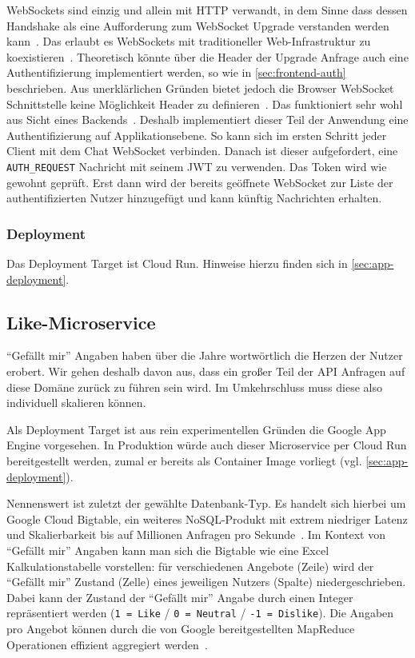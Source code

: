 \documentclass{article}
\begin{document}
WebSockets sind einzig und allein mit HTTP verwandt, in dem Sinne dass dessen Handshake als eine Aufforderung zum WebSocket Upgrade verstanden werden kann~\cite[p.~57]{fielding2014rfc}. Das erlaubt es WebSockets mit traditioneller Web-Infrastruktur zu koexistieren~\cite[pp.~10--11]{fette2011websocket}. Theoretisch könnte über die Header der Upgrade Anfrage auch eine Authentifizierung implementiert werden, so wie in \autoref{sec:frontend-auth} beschrieben. Aus unerklärlichen Gründen bietet jedoch die Browser WebSocket Schnittstelle keine Möglichkeit Header zu definieren~\cite{javascript-websocket}. Das funktioniert sehr wohl aus Sicht eines Backends~\cite{nodejs-websockets}. Deshalb implementiert dieser Teil der Anwendung eine Authentifizierung auf Applikationsebene. So kann sich im ersten Schritt jeder Client mit dem Chat WebSocket verbinden. Danach ist dieser aufgefordert, eine \texttt{AUTH\_REQUEST} Nachricht mit seinem JWT zu verwenden. Das Token wird wie gewohnt geprüft. Erst dann wird der bereits geöffnete WebSocket zur Liste der authentifizierten Nutzer hinzugefügt und kann künftig Nachrichten erhalten.


\subsubsection{Deployment}

Das Deployment Target ist Cloud Run. Hinweise hierzu finden sich in \autoref{sec:app-deployment}.


\subsection{Like-Microservice}


\enquote{Gefällt mir} Angaben haben über die Jahre wortwörtlich die Herzen der Nutzer erobert. Wir gehen deshalb davon aus, dass ein großer Teil der API Anfragen auf diese Domäne zurück zu führen sein wird. Im Umkehrschluss muss diese also individuell skalieren können. 

Als Deployment Target ist aus rein experimentellen Gründen die Google App Engine vorgesehen. In Produktion würde auch dieser Microservice per Cloud Run bereitgestellt werden, zumal er bereits als Container Image vorliegt (vgl. \autoref{sec:app-deployment}).

Nennenswert ist zuletzt der gewählte Datenbank-Typ. Es handelt sich hierbei um Google Cloud Bigtable, ein weiteres NoSQL-Produkt mit extrem niedriger Latenz und Skalierbarkeit bis auf Millionen Anfragen pro Sekunde~\cite{cloud-bigtable}. Im Kontext von \enquote{Gefällt mir} Angaben kann man sich die Bigtable wie eine Excel Kalkulationstabelle vorstellen: für verschiedenen Angebote (Zeile) wird der \enquote{Gefällt mir} Zustand (Zelle) eines jeweiligen Nutzers (Spalte) niedergeschrieben. Dabei kann der Zustand der \enquote{Gefällt mir} Angabe durch einen Integer repräsentiert werden (\texttt{1 = Like} / \texttt{0 = Neutral} / \texttt{-1 = Dislike}). Die Angaben pro Angebot können durch die von Google bereitgestellten MapReduce Operationen effizient aggregiert werden~\cite{cloud-bigtable}.
\end{document}
